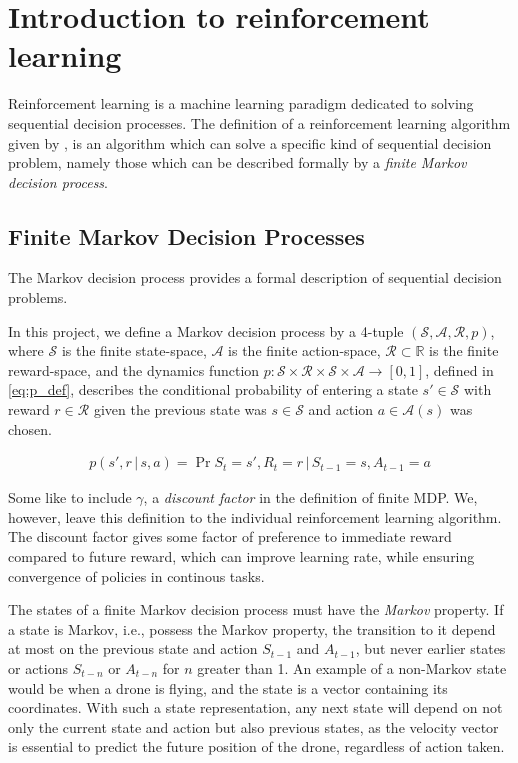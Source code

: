 \section{Introduction to reinforcement learning}
Reinforcement learning is a machine learning paradigm dedicated to solving sequential decision processes. The definition of a reinforcement learning algorithm given by \citet[chap. 3]{RLBook2018}, is an algorithm which can solve a specific kind of sequential decision problem, namely those which can be described formally by a \textit{finite Markov decision process}.


\subsection{Finite Markov Decision Processes}

The Markov decision process provides a formal description of sequential decision problems. 

In this project, we define a Markov decision process by a 4-tuple $(\mathcal{S},\mathcal{A},\mathcal{R}, p)$, where $\mathcal{S}$ is the finite state-space, $\mathcal{A}$ is the finite action-space, $\mathcal{R} \subset \mathbb{R}$ is the finite reward-space, and the dynamics function $p : \mathcal{S} \times \mathcal{R} \times \mathcal{S} \times \mathcal{A} \rightarrow [0,1]$, defined in \cref{eq:p_def}, describes the conditional probability of entering a state $s' \in \mathcal{S}$ with reward $r \in \mathcal{R}$ given the previous state was $s \in \mathcal{S}$ and action $a \in \mathcal{A}(s)$ was chosen.

\begin{align}
    \label{eq:p_def} p(s',r\,|\,s,a) = \Pr{S_t\!=\!s', R_t\!=\!r\,|\,S_{t-1}\!=\!s, A_{t-1}\!=\!a}
\end{align}

Some like to include $\gamma$, a \textit{discount factor} in the definition of finite MDP. 
We, however, leave this definition to the individual reinforcement learning algorithm.
The discount factor gives some factor of preference to immediate reward compared to future reward, which can improve learning rate, while ensuring convergence of policies in continous tasks.

The states of a finite Markov decision process must have the \emph{Markov} property. If a state is Markov, i.e., possess the Markov property, the transition to it depend at most on the previous state and action $S_{t-1}$ and $A_{t-1}$, but never earlier states or actions $S_{t-n}$ or $A_{t-n}$ for $n$ greater than 1.
An example of a non-Markov state would be when a drone is flying, and the state is a vector containing its coordinates.
With such a state representation, any next state will depend on not only the current state and action but also previous states, as the velocity vector is essential to predict the future position of the drone, regardless of action taken.


